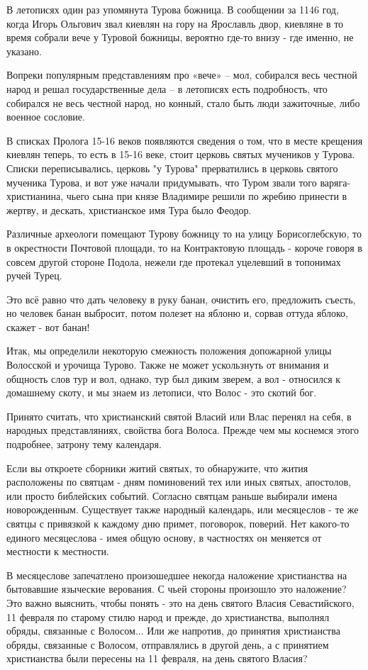 \documentclass[a5paper,11pt,openany]{article}
\begin{document}
    В летописях один раз упомянута Турова божница. В сообщении за 1146 год, когда Игорь Ольгович звал киевлян на гору на Ярославль двор, киевляне в то время собрали вече у Туровой божницы, вероятно
где-то внизу - где именно, не указано. 

   Вопреки популярным представлениям про «вече» – мол, собирался весь честной народ и решал государственные дела – в летописях есть подробность, что собирался не весь честной народ, но конный, стало быть люди зажиточные, либо военное сословие.

   В списках Пролога 15-16 веков появляются сведения о том, что в месте крещения киевлян теперь, то есть в 15-16 веке, стоит церковь святых мучеников у Турова. Списки переписывались, церковь "у Турова" прерватились в церковь святого мученика Турова, и вот уже начали придумывать, что Туром звали того варяга-христианина, чьего сына при князе Владимире решили по жребию принести в жертву, и дескать, христианское имя Тура было Феодор.

   Различные археологи помещают Турову божницу то на улицу Борисоглебскую, то в окрестности Почтовой площади, то на Контрактовую площадь - короче говоря в совсем другой стороне Подола, нежели где протекал уцелевший в топонимах ручей Турец. 

   Это всё равно что дать человеку в руку банан, очистить его, предложить съесть, но человек банан выбросит, потом полезет на яблоню и, сорвав оттуда яблоко, скажет - вот банан!

   Итак, мы определили некоторую смежность положения допожарной улицы Волосской и урочища Турово. Также не может ускользнуть от внимания и общность слов тур и вол, однако, тур был диким зверем, а вол - относился к домашнему скоту, и мы знаем из летописи, что Волос - это скотий бог.

   Принято считать, что христианский святой Власий или Влас перенял на себя, в народных представляниях, свойства бога Волоса. Прежде чем мы коснемся этого подробнее, затрону тему календаря.

   Если вы откроете сборники житий святых, то
 обнаружите, что жития расположены по святцам - дням поминовений тех или иных святых, апостолов, или просто библейских событий. Согласно святцам раньше выбирали имена новорожденным. Существует также народный календарь, или месяцеслов - те же святцы с привязкой к каждому дню примет, поговорок, поверий. Нет какого-то единого месяцеслова - имея общую основу, в частностях он меняется от местности к местности.

   В месяцеслове запечатлено произошедшее некогда наложение христианства на бытовавшие языческие верования. С чьей стороны произошло это наложение? Это важно выяснить, чтобы понять - это на день святого Власия Севастийского, 11 февраля по старому стилю народ и прежде, до христианства, выполнял обряды, связанные с Волосом... Или же напротив, до принятия христианства обряды, связанные с Волосом, отправлялись в другой день, а с принятием христианства были пересены на 11 февраля, на день святого Власия?
\end{document}

